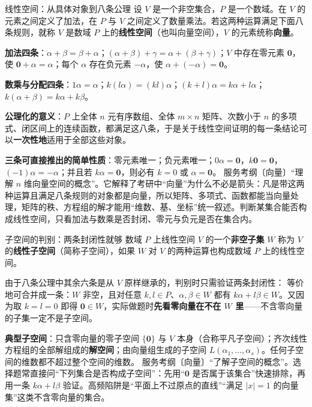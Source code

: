 \begin{fdeep}{线性空间：从具体对象到八条公理}
设 $V$ 是一个非空集合，$P$ 是一个数域。在 $V$ 的元素之间定义了加法，在 $P$ 与 $V$ 之间定义了数量乘法。若这两种运算满足下面八条规则，就称 $V$ 是数域 $P$ 上的\textbf{线性空间}（也叫向量空间），$V$ 的元素统称\textbf{向量}。

\textbf{加法四条}：$\alpha+\beta=\beta+\alpha$；$(\alpha+\beta)+\gamma=\alpha+(\beta+\gamma)$；$V$ 中存在零元素 $\mathbf{0}$，使 $\mathbf{0}+\alpha=\alpha$；每个 $\alpha$ 存在负元素 $-\alpha$，使 $\alpha+(-\alpha)=\mathbf{0}$。

\textbf{数乘与分配四条}：$1\alpha=\alpha$；$k(l\alpha)=(kl)\alpha$；$(k+l)\alpha=k\alpha+l\alpha$；$k(\alpha+\beta)=k\alpha+k\beta$。

\textbf{公理化的意义}：$P$ 上全体 $n$ 元有序数组、全体 $m\times n$ 矩阵、次数小于 $n$ 的多项式、闭区间上的连续函数，都满足这八条，于是关于线性空间证明的每一条结论可以\textbf{一次性地}适用于全部这些对象。

\textbf{三条可直接推出的简单性质}：零元素唯一；负元素唯一；$0\alpha=\mathbf{0}$，$k\mathbf{0}=\mathbf{0}$，$(-1)\alpha=-\alpha$；并且若 $k\alpha=\mathbf{0}$，则必有 $k=0$ 或 $\alpha=\mathbf{0}$。
\fbref{}服务考纲〔向量〕“理解 $n$ 维向量空间的概念”。它解释了考研中“向量”为什么不必是箭头：凡是带这两种运算且满足八条规则的对象都是向量，所以矩阵、多项式、函数都能当向量处理，矩阵的秩、方程组的解才能用“维数、基、坐标”统一叙述。判断某集合能否构成线性空间，只看加法与数乘是否封闭、零元与负元是否在集合内。
\end{fdeep}

\begin{fdeep}{子空间的判别：两条封闭性就够}
数域 $P$ 上线性空间 $V$ 的一个\textbf{非空子集} $W$ 称为 $V$ 的\textbf{线性子空间}（简称子空间），如果 $W$ 对 $V$ 的两种运算也构成数域 $P$ 上的线性空间。

由于八条公理中其余六条是从 $V$ 原样继承的，判别时只需验证两条封闭性：
等价地可合并成一条：$W$ 非空，且对任意 $k,l\in P$、$\alpha,\beta\in W$ 都有 $k\alpha+l\beta\in W$。又因为取 $k=l=0$ 即得 $\mathbf{0}\in W$，实际做题时\textbf{先看零向量在不在 $W$ 里}——不含零向量的子集一定不是子空间。

\textbf{典型子空间}：只含零向量的零子空间 $\{\mathbf{0}\}$ 与 $V$ 本身（合称平凡子空间）；齐次线性方程组的全部解组成的\textbf{解空间}；由向量组生成的子空间 $L(\alpha_1,\dots,\alpha_s)$。任何子空间的维数都不超过整个空间的维数。
\fbref{}服务考纲〔向量〕“了解子空间的概念”。选择题常直接问“下列集合是否构成子空间”：先用“$\mathbf{0}$ 是否属于该集合”快速排除，再用一条 $k\alpha+l\beta$ 验证。高频陷阱是“平面上不过原点的直线”“满足 $|x|=1$ 的向量集”这类不含零向量的集合。
\end{fdeep}

